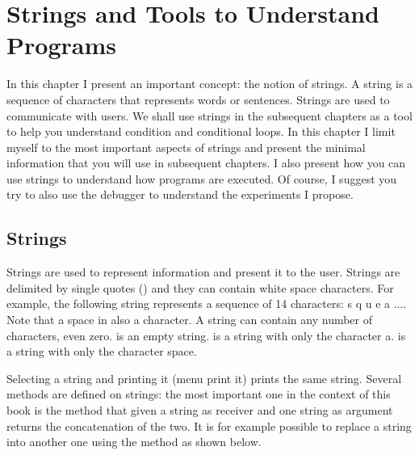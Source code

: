 \ifx\wholebook\relax\else



\fi


\chapter{Strings and Tools to Understand Programs}\label{ch:strings}

In this chapter I present an important concept: the notion of strings. 
A string is a sequence of characters that represents words or sentences. Strings
are used to communicate with users. We shall use strings in the subsequent chapters as a tool to help you understand condition and conditional loops. In this chapter I limit myself to the most important aspects of strings and present the minimal information that you will use in subsequent chapters. I also present how you can use strings to understand how programs are executed. Of course, I suggest you try to also use the debugger to understand the experiments I propose. 

\section{Strings}
Strings are used to represent information and present it to the user. Strings are delimited by single quotes () and they can contain white space characters. For example, the following string  represents a sequence of 14 characters: s q u e a .... Note that a space in also a character. A string can contain any number of characters, even zero.  is an empty string.  is a string with only the character a.  is a string with only the character space. 



Selecting a string and printing it (menu print it) prints the same string.  Several methods are defined on strings: the most important one in the context of this book is the method  \ct{,} that given a string as receiver and one string as argument returns the concatenation of the two. It is for example possible to replace a string into another one using the method  as shown below. 

